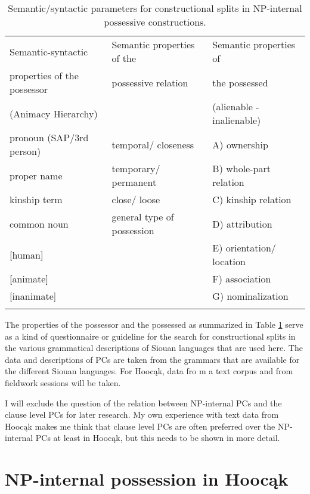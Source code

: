 \documentclass[output=paper]{LSP/langsci}
\begin{document}
\begin{table}
\caption{Semantic/syntactic parameters for constructional splits in NP-internal possessive constructions.} \label{parameters}
\small
\begin{tabular}[h]{ l l l }

\lsptoprule
Semantic-syntactic &	Semantic properties of the & Semantic properties of \\
properties of the possessor & possessive relation &  the possessed \\

(Animacy Hierarchy) & & (alienable - inalienable) \\
\midrule
pronoun (SAP/3rd person) & temporal/ closeness & A) ownership \\
 
proper name & temporary/ permanent & B) whole-part relation \\
 
kinship term & close/ loose & C) kinship relation \\
 
common noun & general type of possession & D) attribution \\
 
{[human]} & & E) orientation/ location \\
 
{[animate]} & & F) association \\
 
{[inanimate]} & & G) nominalization \\
\lspbottomrule
\end{tabular}
\end{table}

The properties of the possessor and the possessed as summarized in Table \ref{parameters} serve as a kind of questionnaire or guideline for the search for constructional splits in the various grammatical descriptions of Siouan languages that are used here. The data and descriptions of PCs are taken from the grammars that are available for the different Siouan languages. For Hoocąk, data fro m a text corpus and from fieldwork sessions will be taken. 

I will exclude the question of the relation between NP-internal PCs and the clause level PCs for later research. My own experience with text data from Hoocąk makes me think that clause level PCs are often preferred over the NP-internal PCs at least in Hoocąk, but this needs to be shown in more detail. 

\section{NP-internal possession in Hoocąk}
\end{document}
